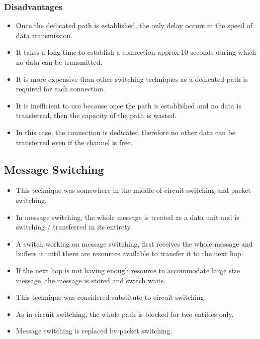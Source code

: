 \begin{multicols}{2}
\subsubsection*{Disadvantages}
	\begin{itemize}
		\item Once the dedicated path is established, the only delay occurs in the speed of data transmission.
		\item It takes a long time to establish a connection approx 10 seconds during which no data can be transmitted.
		\item It is more expensive than other switching techniques as a dedicated path is required for each connection.
		\item It is inefficient to use because once the path is established and no data is transferred, then the capacity of the path is wasted.
		\item In this case, the connection is dedicated therefore no other data can be transferred even if the channel is free.
	\end{itemize}
\end{multicols}


\subsection{Message Switching}
\begin{multicols}{2}
	\begin{itemize}
		\item This technique was somewhere in the middle of circuit switching and packet switching.
		\item In message switching, the whole message is treated as a data unit and is switching / transferred in its entirety.
		
		\item A switch working on message switching, first receives the whole message and buffers it until there are resources available to transfer it to the next hop.
		\item If the next hop is not having enough resource to accommodate large size message, the message is stored and switch waits.
		\item This technique was considered substitute to circuit switching.
		\item As in circuit switching, the whole path is blocked for two entities only.
		\item Message switching is replaced by packet switching.
	\end{itemize}
\end{multicols}


